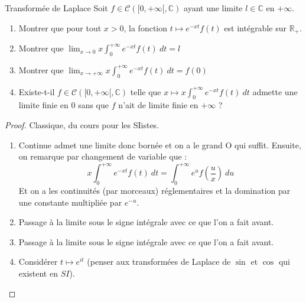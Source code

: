 \documentclass[french,a4paper]{article}
\newcommand{\R}{\mathbb{R}}
\newcommand{\C}{\mathbb{C}}
\theoremstyle{plain}
\theoremstyle{definition}
\theoremstyle{remark}
\begin{document}
\begin{ex}[Moulin.IP.12]{Transformée de Laplace}
	Soit $f\in\mathcal{C}([0,+\infty[,\C)$ ayant une limite $l\in\C$ en $+\infty$.
	\begin{enumerate}
		\item Montrer que pour tout $x>0$, la fonction $t\mapsto e^{-xt}f(t)$ est intégrable sur $\R_+$.
		\item Montrer que $\displaystyle\lim_{x\to 0} x\int_{0}^{+\infty}e^{-xt}f(t)\ dt=l$
		\item Montrer que $\displaystyle\lim_{x\to +\infty} x\int_{0}^{+\infty}e^{-xt}f(t)\ dt=f(0)$
		\item Existe-t-il $f\in\mathcal{C}([0,+\infty[,\C)$ telle que $x\mapsto\displaystyle x\int_{0}^{+\infty}e^{-xt}f(t)\ dt$ admette une limite finie en $0$ sans que $f$ n'ait de limite finie en $+\infty$ ?
	\end{enumerate}
\end{ex}
\begin{proof}
	Classique, du cours pour les SIistes.
	\begin{enumerate}
		\item Continue admet une limite donc bornée et on a le grand O qui suffit. Ensuite, on remarque par changement de variable que  : $$x\int_{0}^{+\infty}e^{-xt}f(t)\ dt=\int_{0}^{+\infty}e^{u}f\left(\frac{u}{x}\right)\ du$$ Et on a les continuités (par morceaux) réglementaires et la domination par une constante multipliée par $e^{-u}$.
		\item Passage à la limite sous le signe intégrale avec ce que l'on a fait avant.
		\item Passage à la limite sous le signe intégrale avec ce que l'on a fait avant.
		\item Considérer $t\mapsto e^{it}$ (penser aux transformées de Laplace de $\sin$ et $\cos$ qui existent en $SI$). 
	\end{enumerate}
\end{proof}
\end{document}
